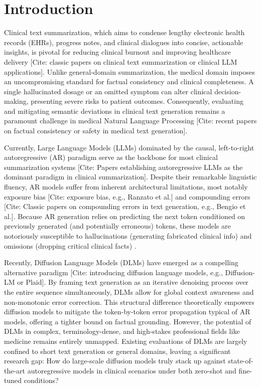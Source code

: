\documentclass[11pt]{article}
\begin{document}
\section{Introduction}

Clinical text summarization, which aims to condense lengthy electronic health records (EHRs), progress notes, and clinical dialogues into concise, actionable insights, is pivotal for reducing clinical burnout and improving healthcare delivery [Cite: classic papers on clinical text summarization or clinical LLM applications]. Unlike general-domain summarization, the medical domain imposes an uncompromising standard for factual consistency and clinical completeness. A single hallucinated dosage or an omitted symptom can alter clinical decision-making, presenting severe risks to patient outcomes. Consequently, evaluating and mitigating semantic deviations in clinical text generation remains a paramount challenge in medical Natural Language Processing [Cite: recent papers on factual consistency or safety in medical text generation].

Currently, Large Language Models (LLMs) dominated by the causal, left-to-right autoregressive (AR) paradigm serve as the backbone for most clinical summarization systems [Cite: Papers establishing autoregressive LLMs as the dominant paradigm in clinical summarization]. Despite their remarkable linguistic fluency, AR models suffer from inherent architectural limitations, most notably exposure bias [Cite: exposure bias, e.g., Ranzato et al.] and compounding errors [Cite: Classic papers on compounding errors in text generation, e.g., Bengio et al.]. Because AR generation relies on predicting the next token conditioned on previously generated (and potentially erroneous) tokens, these models are notoriously susceptible to hallucinations (generating fabricated clinical info) and omissions (dropping critical clinical facts) .

Recently, Diffusion Language Models (DLMs) have emerged as a compelling alternative paradigm [Cite: introducing diffusion language models, e.g., Diffusion-LM or Plaid]. By framing text generation as an iterative denoising process over the entire sequence simultaneously, DLMs allow for global context awareness and non-monotonic error correction. This structural difference theoretically empowers diffusion models to mitigate the token-by-token error propagation typical of AR models, offering a tighter bound on factual grounding. However, the potential of DLMs in complex, terminology-dense, and high-stakes professional fields like medicine remains entirely unmapped. Existing evaluations of DLMs are largely confined to short text generation or general domains, leaving a significant research gap: How do large-scale diffusion models truly stack up against state-of-the-art autoregressive models in clinical scenarios under both zero-shot and fine-tuned conditions?
\end{document}
